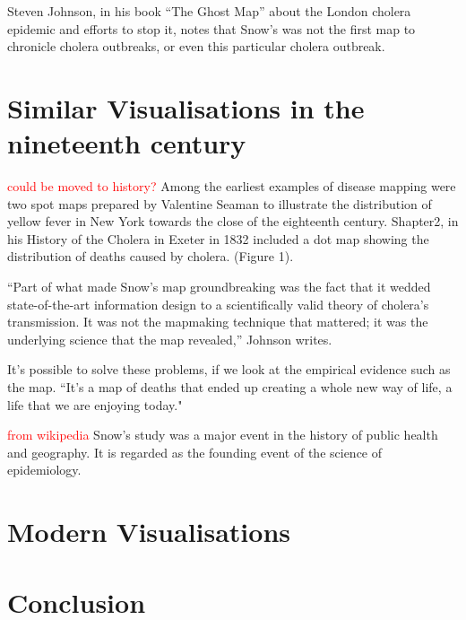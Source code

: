\documentclass[12pt]{article}
\newcommand\todo[1]{\textcolor{red}{#1}}
\begin{document}
Steven Johnson, in his book “The Ghost Map” about the London cholera epidemic and efforts to stop it, notes that Snow’s was not the first map to chronicle cholera outbreaks, or even this particular cholera outbreak. \cite{history}

\section{Similar Visualisations in the nineteenth century}
\todo{could be moved to history?}
Among the earliest examples of disease mapping were
two spot maps prepared by Valentine Seaman to illustrate
the distribution of yellow fever in New York
towards the close of the eighteenth century. Shapter2, in
his History of the Cholera in Exeter in 1832 included a dot
map showing the distribution of deaths caused by
cholera. (Figure 1). \cite{howe1970some}

“Part of what made Snow’s map groundbreaking was the fact that it wedded state-of-the-art information design to a scientifically valid theory of cholera’s transmission. It was not the mapmaking technique that mattered; it was the underlying science that the map revealed,” Johnson writes. \cite{history}

It's possible to solve these problems, if we look at the empirical evidence such as the map. ``It's a  map of deaths that ended up creating a whole new way of life, a life that we are enjoying today." \cite{tedtalk}

\todo{from wikipedia}
Snow's study was a major event in the history of public health and geography. It is regarded as the founding event of the science of epidemiology.


\section{Modern Visualisations}

\section{Conclusion}


% 
% 




\end{document}

